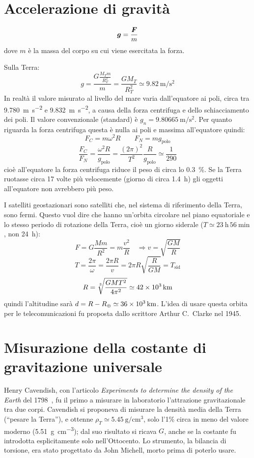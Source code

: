 \section{Accelerazione di gravità}
\begin{Def}
  \[\boldsymbol{g}=\frac{\boldsymbol{F}}{m}\]
  dove $m$ è la massa del corpo su cui viene esercitata la forza.
\end{Def}
Sulla Terra: \[g = \frac{G\frac{M_Tm}{R_T^2}}{m}=\frac{GM_T}{R_T^2}\simeq \SI{9.82}{\meter\per\second\squared} \]
In realtà il valore misurato al livello del mare varia dall'equatore ai poli, circa tra \SI{9.780}{\meter\per\second\squared} e \SI{9.832}{\meter\per\second\squared}, a causa della forza centrifuga e dello
schiacciamento dei poli. Il valore convenzionale (standard) è $g_n=\SI{9.80665}{\meter\per\second\squared}$. Per quanto riguarda la forza centrifuga
questa è nulla ai poli e massima all'equatore quindi:
\[F_C=m\omega^2R\qquad F_N=mg_{\text{polo}}\]
\[\frac{F_C}{F_N}=\frac{\omega^2R}{g_{\text{polo}}}=\frac{(2\pi)^2}{T^2}\frac{R}{g_{\text{polo}}}\simeq\frac{1}{290}\]
cioè all'equatore la forza centrifuga riduce il peso di circa lo \SI{0.3}{\percent}. Se la Terra ruotasse circa 17 volte più velocemente (giorno di circa \SI{1.4}{\hour}) gli oggetti all'equatore non avrebbero più peso.
\begin{Es}
  I satelliti geostazionari sono satelliti che, nel sistema di riferimento della Terra, sono fermi. Questo vuol dire che hanno un'orbita circolare nel piano equatoriale e lo stesso periodo di rotazione della Terra, cioè un giorno siderale ($T\simeq\SI{23}{\hour}\,\SI{56}{\minute}$, non \SI{24}{\hour}):
  \[
    F = G\frac{Mm}{R^2} = m\frac{v^2}{R}\quad\Rightarrow v=\sqrt{\frac{GM}{R}}
  \]
  \[
    T = \frac{2 \pi}{\omega} = \frac{2\pi R}{v} = 2\pi R\sqrt{\frac{R}{GM}} = T_\text{sid}
  \]
  \[
    R = \sqrt[3]{\frac{GMT^2}{4\pi^2}}\simeq \SI{42E3}{\kilo\meter}
  \]
  quindi l'altitudine sarà $d = R - R_\oplus\simeq \SI{36E3}{\kilo\meter}$. L'idea di usare questa orbita per le telecomunicazioni fu proposta dallo scrittore Arthur C.\ Clarke nel 1945.
\end{Es}

\section{Misurazione della costante di gra\-vi\-ta\-zio\-ne u\-ni\-ver\-sa\-le}
Henry Cavendish, con l'articolo \emph{Experiments to determine the density of the Earth} del
1798~\cite{cavendish1798}, fu il primo a misurare in laboratorio l'attrazione gravitazionale tra due corpi. Cavendish si proponeva di misurare la
densità media della Terra (``pesare la Terra''), e ottenne $\rho_T\simeq\SI{5.45}{\gram\per\centi\meter\cubed}$, solo l'1\% circa in meno del valore moderno (\SI{5.51}{\gram\per\centi\meter\cubed}); dal suo risultato si ricava $G$, anche se la costante fu introdotta esplicitamente solo nell'Ottocento. Lo strumento, la bilancia di torsione, era stato progettato da John Michell, morto prima di poterlo usare.

